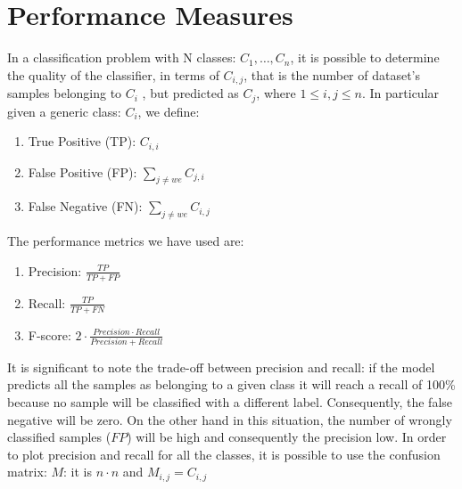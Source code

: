 \documentclass[LaM,binding=0.6cm]{sapthesis}
\begin{document}
\section{Performance Measures}
In a classification problem with N classes: ${C_1,\dots,C_n}$, it is possible to determine the quality of the classifier, in terms of $C_{i,j}$, that is the number of dataset's samples belonging to $C_i$ , but predicted as $C_j$, where $1 \leq i,j \leq n$. In particular given a generic class: $C_i$, we define:
\begin{enumerate}
\item True Positive (TP): $C_{i,i}$%
\item False Positive (FP): $\sum_{j\neq we}C_{j,i}$
\item False Negative (FN): $\sum_{j\neq we}C_{i,j}$
\end{enumerate}
The performance metrics we have used are:
\begin{enumerate}
\item Precision: $\frac{TP}{TP+FP}$
\item Recall: $\frac{TP}{TP+FN}$
\item F-score: $2\cdot \frac{Precision\cdot Recall}{Precision+Recall}$
\end{enumerate}
It is significant to note the trade-off between precision and recall: if the model predicts all the samples as belonging to a given class it will reach a recall of 100\% because no sample will be classified with a different label. Consequently, the false negative will be zero. On the other hand in this situation, the number of wrongly classified samples ($FP$) will be high and consequently the precision low. In order to plot precision and recall for all the classes, it is possible to use the confusion matrix: $M$: it is $n\cdot n$ and $M_{i,j}=C_{i,j}$
\end{document}
